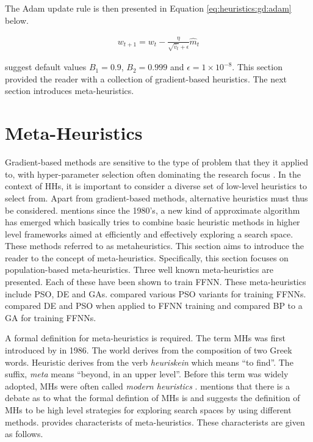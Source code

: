 The \ac{Adam} update rule is then presented in Equation \ref{eq:heuristics:gd:adam} below.

\begin{equation}
    \label{eq:heuristics:gd:adam}
    \begin{split}
        w_{t+1} = w_{t} - \frac{\eta}{\sqrt{\hat{v}_{t}} + \epsilon}\hat{m}_{t}
    \end{split}
\end{equation}

\citeauthor{ref:kingma:2014} \cite{ref:kingma:2014} suggest default values $B_{1}=0.9$, $B_{2}=0.999$ and $\epsilon = 1 \times 10^{-8}$. This section provided the reader with a collection of gradient-based heuristics. The next section introduces meta-heuristics.

\section{Meta-Heuristics}
\label{sec:heuristics:mh}

Gradient-based methods are sensitive to the type of problem that they it applied to, with hyper-parameter selection often dominating the research focus \cite{ref:bengio:2000}\cite{ref:feurer:2019}. In the context of \acp{HH}, it is important to consider a diverse set of low-level heuristics to select from. Apart from gradient-based methods, alternative heuristics must thus be considered. \cite{ref:blum:2003} mentions since the 1980's, a new kind of approximate algorithm has emerged which basically tries to combine basic heuristic methods in higher level frameworks aimed at efficiently and effectively exploring a search space. These methods referred to as metaheuristics. This section aims to introduce the reader to the concept of meta-heuristics. Specifically, this section focuses on population-based meta-heuristics. Three well known meta-heuristics are presented. Each of these have been shown to train \ac{FFNN}. These meta-heuristics include \ac{PSO}, \ac{DE} and \acp{GA}. \cite{ref:carvalho:2006} compared various \ac{PSO} variants for training \acp{FFNN}. \cite{ref:espinal:2011} compared \ac{DE} and \ac{PSO} when applied to \ac{FFNN} training and \cite{ref:gupta:1999} compared \ac{BP} to a \ac{GA} for training \acp{FFNN}.

A formal definition for meta-heuristics is required. The term \aclp{MH} was first introduced by \citeauthor{ref:glover:1986}\cite{ref:glover:1986} in 1986. The world derives from the composition of two Greek words. Heuristic derives from the verb \textit{heuriskein} which means ``to find''. The suffix, \textit{meta} means ``beyond, in an upper level''. Before this term was widely adopted, \acp{MH} were often called \textit{modern heuristics} \cite{ref:reeves:1993}. \cite{ref:blum:2003} mentions that there is a debate as to what the formal defintion of \acp{MH} is and suggests the definition of \acp{MH} to be high level strategies for exploring search spaces by using different methods. \citeauthor{ref:blum:2003} \cite{ref:blum:2003} provides characterists of meta-heuristics. These characterists are given as follows.

